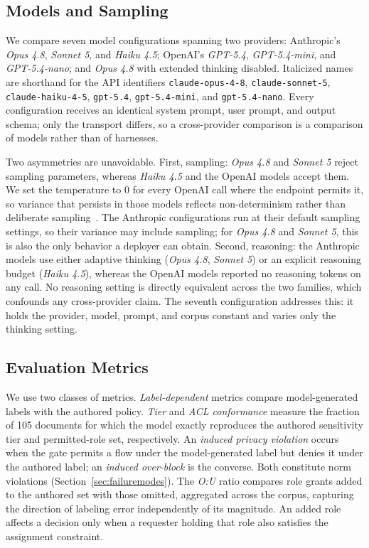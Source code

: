 \subsection{Models and Sampling}
\label{sec:models}
We compare seven model configurations spanning two providers: Anthropic's
{\em Opus 4.8}, {\em Sonnet 5}, and {\em Haiku 4.5}; OpenAI's {\em GPT-5.4},
{\em GPT-5.4-mini}, and {\em GPT-5.4-nano}; and {\em Opus 4.8} with extended
thinking disabled. Italicized names are shorthand for the API identifiers
\texttt{claude-opus-4-8}, \texttt{claude-sonnet-5}, \texttt{claude-haiku-4-5},
\texttt{gpt-5.4}, \texttt{gpt-5.4-mini}, and \texttt{gpt-5.4-nano}. Every
configuration receives an identical system prompt, user prompt, and output
schema; only the transport differs, so a cross-provider comparison is a
comparison of models rather than of harnesses.

Two asymmetries are unavoidable. First, sampling: {\em Opus 4.8} and
{\em Sonnet 5} reject sampling parameters, whereas {\em Haiku 4.5} and the
OpenAI models accept them. We set the temperature to 0 for every OpenAI call
where the endpoint permits it, so variance that persists in those models
reflects non-determinism rather than deliberate sampling~\cite{atil2024}. The
Anthropic configurations run at their default sampling settings, so their
variance may include sampling; for {\em Opus 4.8} and {\em Sonnet 5}, this is
also the only behavior a deployer can obtain. Second, reasoning: the Anthropic
models use either adaptive thinking ({\em Opus 4.8}, {\em Sonnet 5}) or an
explicit reasoning budget ({\em Haiku 4.5}), whereas the OpenAI models reported
no reasoning tokens on any call. No reasoning setting is directly equivalent
across the two families, which confounds any cross-provider claim. The seventh
configuration addresses this: it holds the provider, model, prompt, and corpus
constant and varies only the thinking setting.

\subsection{Evaluation Metrics}
\label{sec:measures}

We use two classes of metrics. \textit{Label-dependent} metrics compare model-generated labels with the authored policy. \textit{Tier} and \textit{ACL conformance} measure the fraction of 105 documents for which the model exactly reproduces the authored sensitivity tier and permitted-role set, respectively. An \textit{induced privacy violation} occurs when the gate permits a flow under the model-generated label but denies it under the authored label; an \textit{induced over-block} is the converse. Both constitute norm violations (Section~\ref{sec:failuremodes}). The \textit{O:U} ratio compares role grants added to the authored set with those omitted, aggregated across the corpus, capturing the direction of labeling error independently of its magnitude. An added role affects a decision only when a requester holding that role also satisfies the assignment constraint.

